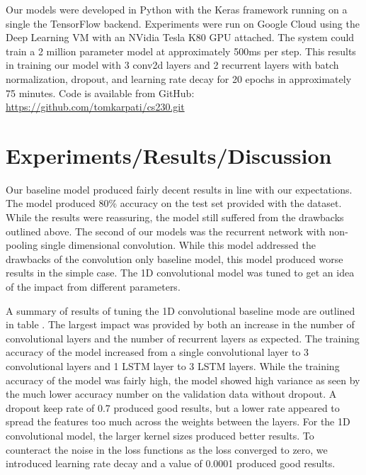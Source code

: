 \documentclass{article}
\begin{document}
Our models were developed in Python with the Keras framework running
on a single the TensorFlow backend. Experiments were run on Google
Cloud using the Deep Learning VM with an NVidia Tesla K80 GPU
attached. The system could train a 2 million parameter model at
approximately 500ms per step. This results in training our model with
3 conv2d layers and 2 recurrent layers with batch normalization,
dropout, and learning rate decay for 20 epochs in approximately 75
minutes. Code is available from GitHub:
\url{https://github.com/tomkarpati/cs230.git}

\section{Experiments/Results/Discussion}
Our baseline model produced fairly decent results in line with our
expectations. The model produced 80\% accuracy on the test set
provided with the dataset. While the results were reassuring, the
model still suffered from the drawbacks outlined above. The second of
our models was the recurrent network with non-pooling single
dimensional convolution. While this model addressed the drawbacks of
the convolution only baseline model, this model produced worse results
in the simple case. The 1D convolutional model was tuned to get an
idea of the impact from different parameters.

A summary of results of tuning the 1D convolutional baseline mode are
outlined in table \cite{tab:summary-results}. The largest impact was
provided by both an increase in the number of convolutional layers and
the number of recurrent layers as expected. The training accuracy of
the model increased from a single convolutional layer to 3
convolutional layers and 1 LSTM layer to 3 LSTM layers. While the
training accuracy of the model was fairly high, the model showed high
variance as seen by the much lower accuracy number on the validation
data without dropout. A dropout keep rate of 0.7
produced good results, but a lower rate appeared to spread the
features too much across the weights between the layers. For the 1D
convolutional model, the larger kernel sizes produced better
results. To counteract the noise in the loss functions
as the loss converged to zero, we introduced learning rate decay and a
value of 0.0001 produced good results.
\end{document}
